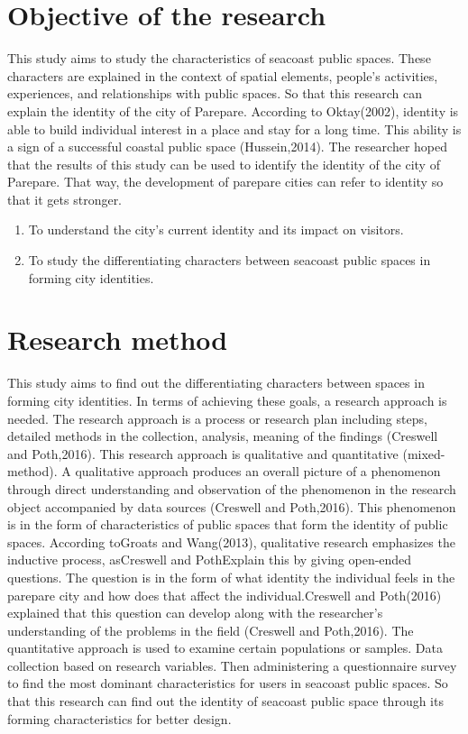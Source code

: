 \documentclass[11pt]{simart} %
\begin{document}
\section{Objective of the research}

This study aims to study the characteristics of seacoast public spaces. These characters are explained in the context of spatial elements, people's activities, experiences, and relationships with public spaces. So that this research can explain the identity of the city of Parepare. According to Oktay(2002), identity is able to build individual interest in a place and stay for a long time. This ability is a sign of a successful coastal public space (Hussein,2014).
The researcher hoped that the results of this study can be used to identify the identity of the city of Parepare. That way, the development of parepare cities can refer to identity so that it gets stronger.
\begin{enumerate}
\item To understand the city's current identity and its impact on visitors.
\item To study the differentiating characters between seacoast public spaces in forming city identities.
\end{enumerate}

\section{Research method}
This study aims to find out the differentiating characters between spaces in forming city identities. In terms of achieving these goals, a research approach is needed. The research approach is a process or research plan including steps, detailed methods in the collection, analysis, meaning of the findings (Creswell and Poth,2016). This research approach is qualitative and quantitative (mixed-method).
A qualitative approach produces an overall picture of a phenomenon through direct understanding and observation of the phenomenon in the research object accompanied by data sources (Creswell and Poth,2016). This phenomenon is in the form of characteristics of public spaces that form the identity of public spaces. According toGroats and Wang(2013), qualitative research emphasizes the inductive process, asCreswell and PothExplain this by giving open-ended questions. The question is in the form of what identity the individual feels in the parepare city and how does that affect the individual.Creswell and Poth(2016) explained that this question can develop along with the researcher's understanding of the problems in the field (Creswell and Poth,2016). The quantitative approach is used to examine certain populations or samples. Data collection based on research variables. Then administering a questionnaire survey to find the most dominant characteristics for users in seacoast public spaces. So that this research can find out the identity of seacoast public space through its forming characteristics for better design.
\end{document}
